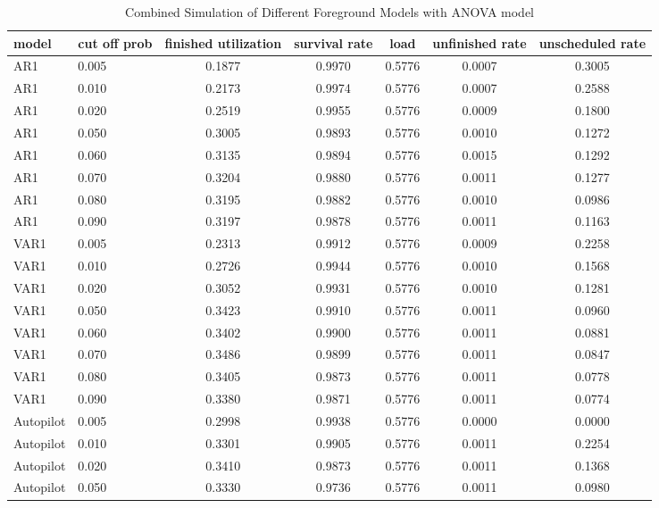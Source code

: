 \documentclass{article}
\begin{document}
\begin{longtable}[htbp]{l|l|*{5}{c}} 
  \caption{Combined Simulation of Different Foreground Models with ANOVA model}
  \label{tab:tab3.2.5}\\
  \textbf{model} & \textbf{cut off prob} & \textbf{finished utilization} &
  \textbf{survival rate} & \textbf{load} & \textbf{unfinished rate} &
  \textbf{unscheduled rate} \\
  \hline
  AR1 & 0.005 & 0.1877 & 0.9970 & 0.5776 & 0.0007 & 0.3005\\
  AR1 & 0.010 & 0.2173 & 0.9974 & 0.5776 & 0.0007 & 0.2588\\
  AR1 & 0.020 & 0.2519 & 0.9955 & 0.5776 & 0.0009 & 0.1800\\
  AR1 & 0.050 & 0.3005 & 0.9893 & 0.5776 & 0.0010 & 0.1272\\
  AR1 & 0.060 & 0.3135 & 0.9894 & 0.5776 & 0.0015 & 0.1292\\
  AR1 & 0.070 & 0.3204 & 0.9880 & 0.5776 & 0.0011 & 0.1277\\
  AR1 & 0.080 & 0.3195 & 0.9882 & 0.5776 & 0.0010 & 0.0986\\
  AR1 & 0.090 & 0.3197 & 0.9878 & 0.5776 & 0.0011 & 0.1163\\
  VAR1 & 0.005 & 0.2313 & 0.9912 & 0.5776 & 0.0009 & 0.2258\\
  VAR1 & 0.010 & 0.2726 & 0.9944 & 0.5776 & 0.0010 & 0.1568\\
  VAR1 & 0.020 & 0.3052 & 0.9931 & 0.5776 & 0.0010 & 0.1281\\
  VAR1 & 0.050 & 0.3423 & 0.9910 & 0.5776 & 0.0011 & 0.0960\\
  VAR1 & 0.060 & 0.3402 & 0.9900 & 0.5776 & 0.0011 & 0.0881\\
  VAR1 & 0.070 & 0.3486 & 0.9899 & 0.5776 & 0.0011 & 0.0847\\
  VAR1 & 0.080 & 0.3405 & 0.9873 & 0.5776 & 0.0011 & 0.0778\\
  VAR1 & 0.090 & 0.3380 & 0.9871 & 0.5776 & 0.0011 & 0.0774\\
  Autopilot & 0.005 & 0.2998 & 0.9938 & 0.5776 & 0.0000 & 0.0000\\
  Autopilot & 0.010 & 0.3301 & 0.9905 & 0.5776 & 0.0011 & 0.2254\\
  Autopilot & 0.020 & 0.3410 & 0.9873 & 0.5776 & 0.0011 & 0.1368\\
  Autopilot & 0.050 & 0.3330 & 0.9736 & 0.5776 & 0.0011 & 0.0980\\
\end{longtable}
\end{document}
